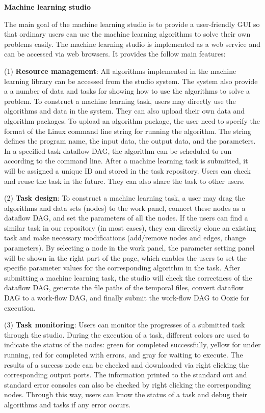 \documentclass{sig-alternate-05-2015}
\begin{document}
\noindent\textbf{Machine learning studio}

The main goal of the machine learning studio is to provide a user-friendly GUI so that ordinary users can use the machine learning algorithms to solve their own problems easily. The machine learning studio is implemented as a web service and can be accessed via web browsers. It provides the follow main features:

(1) \textbf{Resource management}: All algorithms implemented in the machine learning library can be accessed from the studio system. The system also provide a a number of data and tasks for showing how to use the algorithms to solve a problem. To construct a machine learning task, users may directly use the algorithms and data in the system. They can also upload their own data and algorithm packages. To upload an algorithm package, the user need to specify the format of the Linux command line string for running the algorithm. The string defines the program name, the input data, the output data, and the parameters. In a specified task dataflow DAG, the algorithm can be scheduled to run according to the command line. After a machine learning task is submitted, it will be assigned a unique ID and stored in the task repository. Users can check and reuse the task in the future. They can also share the task to other users.

(2) \textbf{Task design}: To construct a machine learning task, a user may drag the algorithms and data sets (nodes) to the work panel, connect these nodes as a dataflow DAG, and set the parameters of all the nodes. If the users can find a similar task in our repository (in most cases), they can directly clone an existing task and make necessary modifications (add/remove nodes and edges, change parameters). By selecting a node in the work panel, the parameter setting panel will be shown in the right part of the page, which enables the users to set the specific parameter values for the corresponding algorithm in the task. After submitting a machine learning task, the studio will check the correctness of the dataflow DAG, generate the file paths of the temporal files, convert dataflow DAG to a work-flow DAG, and finally submit the work-flow DAG to Oozie for execution.

(3) \textbf{Task monitoring}: Users can monitor the progresses of a submitted task through the studio. During the execution of a task, different colors are used to indicate the status of the nodes: green for completed successfully, yellow for under running, red for completed with errors, and gray for waiting to execute. The results of a success node can be checked and downloaded via right clicking the corresponding output ports. The information printed to the standard out and standard error consoles can also be checked by right clicking the corresponding nodes. Through this way, users can know the status of a task and debug their algorithms and tasks if any error occurs.
\end{document}
